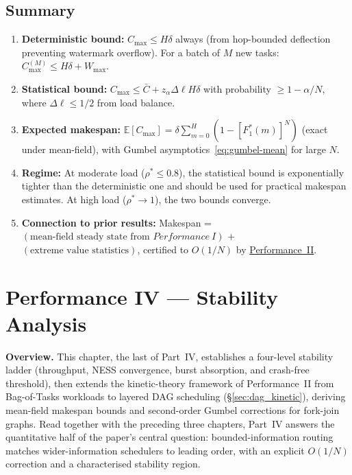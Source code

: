 \documentclass[11pt,a4paper]{report}
\newcommand{\rhostar}{\rho^{*}}
\newcommand{\Wmax}{W_{\max}}
\newcommand{\Dl}{\Delta\ell}
\newcommand{\Cmax}{C_{\max}}
\newcommand{\Cbar}{\bar{C}}
\begin{document}
\section{Summary}

\begin{enumerate}
  \item \textbf{Deterministic bound:}
        $\Cmax \leq H\delta$ always
        (from hop-bounded deflection preventing watermark overflow).
        For a batch of $M$ new tasks: $\Cmax^{(M)} \leq H\delta + \Wmax$.

  \item \textbf{Statistical bound:}
        $\Cmax \leq \Cbar + z_\alpha \Dl H\delta$
        with probability $\geq 1-\alpha/N$,
        where $\Dl \leq 1/2$ from load balance.

  \item \textbf{Expected makespan:}
        $\mathbb{E}[\Cmax] = \delta\sum_{m=0}^{H}(1-[F_1^*(m)]^N)$
        (exact under mean-field), with Gumbel asymptotics~\eqref{eq:gumbel-mean}
        for large $N$.

  \item \textbf{Regime:} At moderate load ($\rhostar \leq 0.8$),
        the statistical bound is exponentially tighter than the
        deterministic one and should be used for practical makespan estimates.
        At high load ($\rhostar \to 1$), the two bounds converge.

  \item \textbf{Connection to prior results:}
        Makespan = $(\text{mean-field steady state from } \hyperref[chap:load_balance]{Performance~I})$
        $+$ $(\text{extreme value statistics})$,
        certified to $O(1/N)$ by \hyperref[chap:kinetic_theory]{Performance~II}.
\end{enumerate}


\chapter{Performance IV --- Stability Analysis}
\label{chap:stability}

\bigskip
\noindent\textbf{Overview.}
This chapter, the last of Part~IV, establishes a four-level stability
ladder (throughput, NESS convergence, burst absorption, and
crash-free threshold), then extends the kinetic-theory framework of
Performance~II from Bag-of-Tasks workloads to layered DAG scheduling
(\S\ref{sec:dag_kinetic}), deriving mean-field makespan bounds and
second-order Gumbel corrections for fork-join graphs. Read together
with the preceding three chapters, Part~IV answers the quantitative
half of the paper's central question: bounded-information routing
matches wider-information schedulers to leading order, with an
explicit $O(1/N)$ correction and a characterised stability region.
\end{document}
